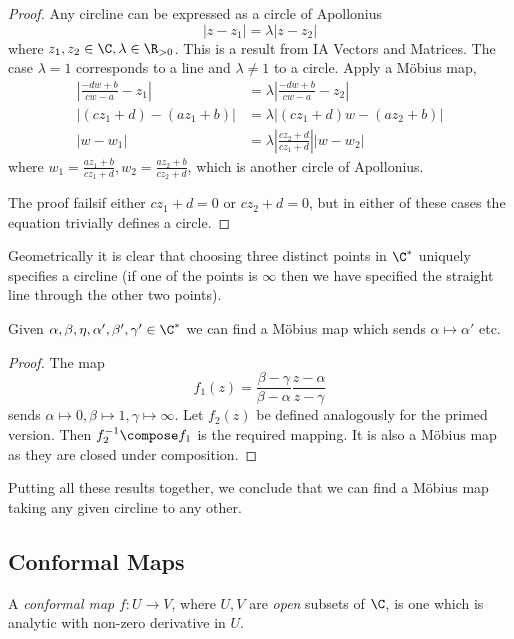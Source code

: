 \documentclass[a4paper]{article}
\begin{document}
\begin{proof}
  Any circline can be expressed as a circle of Apollonius
  \[
    |z - z_1| = \lambda|z - z_2|
  \]
  where \(z_1, z_2  \in \C, \lambda \in \R_{> 0}\). This is a result from IA Vectors and Matrices. The case \(\lambda = 1\) corresponds to a line and \(\lambda \neq 1\) to a circle. Apply a Möbius map,
  \begin{align*}
    \left| \frac{-dw + b}{cw - a} - z_1 \right| &= \lambda \left| \frac{-dw + b}{cw - a} - z_2 \right| \\
    |(cz_1 + d) - (az_1 + b)| &= \lambda|(cz_1 + d)w - (az_2 + b)| \\
    |w - w_1| &= \lambda \left| \frac{cz_2 + d}{cz_1 + d} \right| |w - w_2|
  \end{align*}
  where \(w_1 = \frac{az_1 + b}{cz_1 + d}, w_2 = \frac{az_2 + b}{cz_2 + d}\), which is another circle of Apollonius.

  The proof failsif either \(cz_1 + d = 0\) or \(cz_2 + d = 0\), but in either of these cases the equation trivially defines a circle.
\end{proof}

Geometrically it is clear that choosing three distinct points in \(\C^*\) uniquely specifies a circline (if one of the points is \(\infty\) then we have specified the straight line through the other two points).

Given \(\alpha, \beta, \eta, \alpha', \beta', \gamma' \in \C^*\) we can find a Möbius map which sends \(\alpha \mapsto \alpha'\) etc.

\begin{proof}
  The map
  \[
    f_1(z) = \frac{\beta - \gamma}{\beta - \alpha}\frac{z - \alpha}{z - \gamma}
  \]
  sends \(\alpha \mapsto 0, \beta \mapsto 1, \gamma \mapsto \infty\). Let \(f_2(z)\) be defined analogously for the primed version. Then \(f_2^{-1} \compose f_1\) is the required mapping. It is also a Möbius map as they are closed under composition.
\end{proof}

Putting all these results together, we conclude that we can find a Möbius map taking any given circline to any other.

\subsection{Conformal Maps}

\begin{definition}
  A \emph{conformal map} \(f: U \to V\), where \(U, V\) are \emph{open} subsets of \(\C\), is one which is analytic with non-zero derivative in \(U\).
\end{definition}
\end{document}
